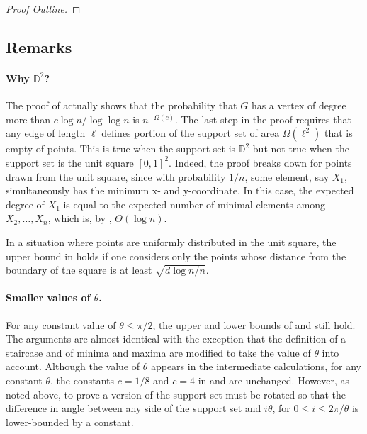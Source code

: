 \documentclass[10pt]{llncs}
\newcommand{\D}{\mathbb{D}}
\begin{document}
\begin{proof}[Proof Outline]
%
%
\end{proof}

\subsection{Remarks}

\paragraph{Why $\D^2$?} 
The proof of  actually shows that the
probability that $G$ has a vertex of degree more than $c\log n/\log\log n$
is $n^{-\Omega(c)}$.  The last step in the proof requires that any edge of
length $\ell$ defines portion of the support set of area $\Omega(\ell^2)$
that is empty of points.  This is true when the support set is $\D^2$
but not true when the support set is the unit square $[0,1]^2$.
Indeed, the proof breaks down for points drawn from the unit square,
since with probability $1/n$, some element, say $X_1$, simultaneously
has the minimum $\mathrm x$- and $\mathrm y$-coordinate.  In this case,
the expected degree of $X_1$ is equal to the expected number of minimal
elements among $X_2,\ldots,X_n$, which is, by , $\Theta(\log n)$.

In a situation where points are uniformly distributed in the unit square,
the upper bound in  holds if one considers only
the points whose distance from the boundary of the square is at least
$\sqrt{d\log n/n}$.

\paragraph{Smaller values of $\theta$.}
For any constant value of $\theta \le \pi /2$, the upper and lower bounds
of  and 
still hold.  The arguments are almost identical with the exception that
the definition of a staircase and of minima and maxima are modified to
take the value of $\theta$ into account.  Although the value of $\theta$
appears in the intermediate calculations, for any constant $\theta$,
the constants $c=1/8$ and $c=4$ in 
and  are unchanged.  However, as noted above,
to prove a version of  the support set
must be rotated so that the difference in angle between any side of the
support set and $i\theta$, for $0\le i\le 2\pi/\theta$ is lower-bounded
by a constant.
\end{document}
